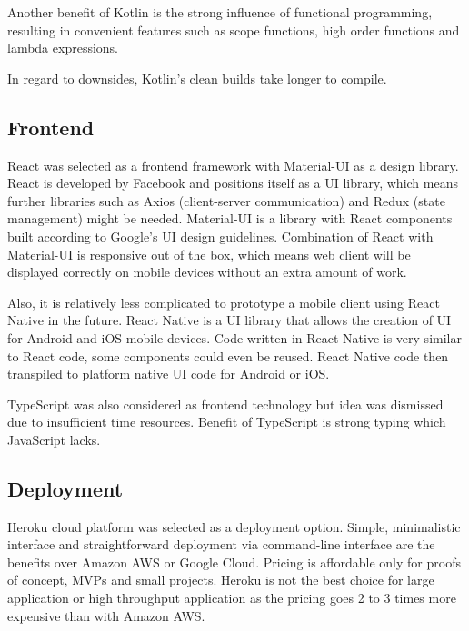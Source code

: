 Another benefit of Kotlin is the strong influence of functional programming,
resulting in convenient features such as scope functions, high order functions and lambda expressions.

In regard to downsides, Kotlin's clean builds take longer to compile.\cite{kotlin-compile}

\subsection{Frontend}\label{subsec:ts-frontend}

React was selected as a frontend framework with Material-UI as a design library.\cite{react, material}
React is developed by Facebook and positions itself as a UI library, which means further libraries
such as Axios (client-server communication) and Redux (state management) might be needed.\cite{axios, redux}
Material-UI is a library with React components built according to Google's UI design guidelines.
Combination of React with Material-UI is responsive out of the box, which means web client will be displayed
correctly on mobile devices without an extra amount of work.

Also, it is relatively less complicated to prototype a mobile client using React Native in the future.\cite{react-native}
React Native is a UI library that allows the creation of UI for Android and iOS mobile devices.
Code written in React Native is very similar to React code, some components could even be reused.
React Native code then transpiled to platform native UI code for Android or iOS\@.

TypeScript was also considered as frontend technology but idea was dismissed due to insufficient time resources.
Benefit of TypeScript is strong typing which JavaScript lacks.\cite{typescript}

\subsection{Deployment}\label{subsec:ts-deployment}

Heroku cloud platform was selected as a deployment option.
Simple, minimalistic interface and straightforward deployment via command-line interface are the benefits over Amazon AWS or Google Cloud.
Pricing is affordable only for proofs of concept, MVPs and small projects.
Heroku is not the best choice for large application or high throughput application as the pricing goes 2 to 3
times more expensive than with Amazon AWS.\cite{heroku-vs-aws}

